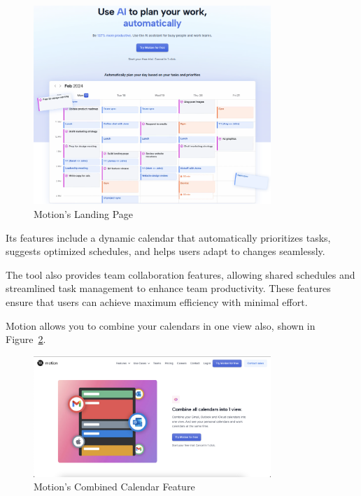 \documentclass[12pt,a4paper,twoside]{report}
\begin{document}
\begin{figure}[!h]
    \centering
    \includegraphics[width=0.8\textwidth]{images/competitors/motion-landing.png}
    \caption{Motion's Landing Page}
    \label{fig:motion-landing}
\end{figure}

Its features include a dynamic calendar that automatically prioritizes tasks, suggests optimized schedules, and helps users adapt to changes seamlessly.

The tool also provides team collaboration features, allowing shared schedules and streamlined task management to enhance team productivity.
These features ensure that users can achieve maximum efficiency with minimal effort.

Motion allows you to combine your calendars in one view also, shown in Figure~\ref{fig:motion-combined-calendar}.

\begin{figure}[!h]
    \centering
    \includegraphics[width=0.8\textwidth]{images/competitors/motion-combined-calendar.png}
    \caption{Motion's Combined Calendar Feature}
    \label{fig:motion-combined-calendar}
\end{figure}
\end{document}
